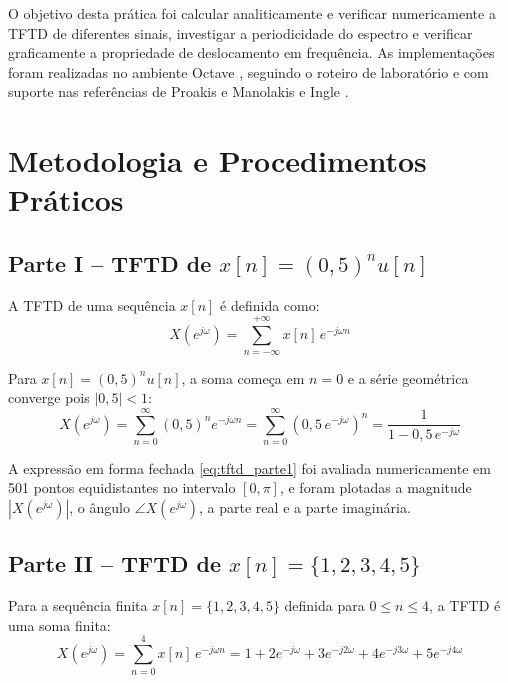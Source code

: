 \documentclass[tcc]{classe_uftex/uftex}
\begin{document}
O objetivo desta prática foi calcular analiticamente e verificar numericamente a TFTD de diferentes sinais, investigar a periodicidade do espectro e verificar graficamente a propriedade de deslocamento em frequência. As implementações foram realizadas no ambiente Octave \cite{octaveman}, seguindo o roteiro de laboratório \cite{roteiro04} e com suporte nas referências de Proakis e Manolakis \cite{proakis_manolakis} e Ingle \cite{ingle2017}.

\chapter{Metodologia e Procedimentos Práticos}

\section{Parte I -- TFTD de $x[n] = (0{,}5)^n u[n]$}

A TFTD de uma sequência $x[n]$ é definida como:
\begin{equation}
  X(e^{j\omega}) = \sum_{n=-\infty}^{+\infty} x[n]\, e^{-j\omega n}
  \label{eq:tftd_def}
\end{equation}

Para $x[n] = (0{,}5)^n u[n]$, a soma começa em $n=0$ e a série geométrica converge pois $|0{,}5| < 1$:
\begin{equation}
  X(e^{j\omega}) = \sum_{n=0}^{\infty} (0{,}5)^n e^{-j\omega n}
  = \sum_{n=0}^{\infty} \left(0{,}5\, e^{-j\omega}\right)^n
  = \frac{1}{1 - 0{,}5\, e^{-j\omega}}
  \label{eq:tftd_parte1}
\end{equation}

A expressão em forma fechada \eqref{eq:tftd_parte1} foi avaliada numericamente em 501 pontos equidistantes no intervalo $[0, \pi]$, e foram plotadas a magnitude $|X(e^{j\omega})|$, o ângulo $\angle X(e^{j\omega})$, a parte real e a parte imaginária.

\section{Parte II -- TFTD de $x[n] = \{1, 2, 3, 4, 5\}$}

Para a sequência finita $x[n] = \{1, 2, 3, 4, 5\}$ definida para $0 \leq n \leq 4$, a TFTD é uma soma finita:
\begin{equation}
  X(e^{j\omega}) = \sum_{n=0}^{4} x[n]\, e^{-j\omega n}
  = 1 + 2e^{-j\omega} + 3e^{-j2\omega} + 4e^{-j3\omega} + 5e^{-j4\omega}
  \label{eq:tftd_parte2}
\end{equation}
\end{document}
